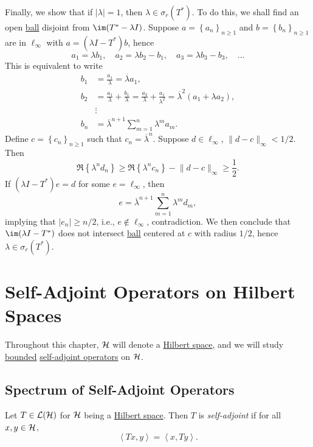 \begin{eg}
\begin{itemize}
		      Finally, we show that if \(\vert \lambda  \vert = 1\), then \(\lambda \in \sigma _r(T^{\ast} )\). To do this, we shall find an open \hyperref[def:ball]{ball} disjoint from \(\im(T^{\ast} - \lambda I)\). Suppose \(a = \left\{ a_n \right\} _{n\geq 1}\) and \(b = \left\{ b_n \right\} _{n\geq 1}\) are in \(\ell _\infty \) with \(a = (\lambda I-T^{\ast} )b\), hence
		      \[
			      a_1 = \lambda b_1,\quad
			      a_2 = \lambda b_2 - b_1,\quad
			      a_3 = \lambda b_3 - b_3, \quad \ldots
		      \]
		      This is equivalent to write
		      \[
			      \begin{split}
				      b_1 &= \frac{a_1}{\lambda } = \overline{\lambda} a_1, \\
				      b_2 &= \frac{a_1}{\lambda } + \frac{b_1}{\lambda } = \frac{a_2}{\lambda } + \frac{a_1}{\lambda ^{2} } = \overline{\lambda} ^{2} (a_1 + \lambda a_2), \\
				      &\vdots\\
				      b_n &= \overline{\lambda} ^{n+1}\sum_{m=1}^{n} \lambda ^m a_m.
			      \end{split}
		      \]
		      Define \(c = \left\{ c_n \right\} _{n\geq 1}\) such that \(c_n = \overline{\lambda} ^n\). Suppose \(d\in \ell _\infty \), \(\lVert d-c \rVert _\infty < 1/2\). Then
		      \[
			      \Re \left\{ \lambda ^n d_n \right\}
			      \geq \Re \left\{ \lambda ^n c_n \right\} - \lVert d-c \rVert _\infty
			      \geq \frac{1}{2}.
		      \]
		      If \((\lambda I - T^{\ast} ) e = d\) for some \(e = \ell _\infty \), then
		      \[
			      e = \overline{\lambda} ^{n+1} \sum_{m=1}^{n} \lambda ^m d_m,
		      \]
		      implying that \(\vert e_n \vert \geq n / 2\), i.e., \(e \notin \ell _\infty \), contradiction. We then conclude that \(\im(\lambda I - T^{\ast} )\) does not intersect \hyperref[def:ball]{ball} centered at \(c\) with radius \(1 / 2\), hence \(\lambda \in \sigma _r(T^{\ast} )\).
	\end{itemize}
\end{eg}

\chapter{Self-Adjoint Operators on Hilbert Spaces}
Throughout this chapter, \(\mathcal{\MakeUppercase{h}} \) will denote a \hyperref[def:Hilbert-space]{Hilbert space}, and we will study \hyperref[rmk:bounded-op]{bounded} \hyperref[def:self-adjoint-op]{self-adjoint operators} on \(\mathcal{\MakeUppercase{h}} \).

\section{Spectrum of Self-Adjoint Operators}
\begin{definition}\label{def:self-adjoint-op}
	Let \(T\in \mathcal{\MakeUppercase{l}} (\mathcal{\MakeUppercase{h}} )\) for \(\mathcal{\MakeUppercase{h}} \) being a \hyperref[def:Hilbert-space]{Hilbert space}. Then \(T\) is \emph{self-adjoint} if for all \(x, y\in \mathcal{\MakeUppercase{h}} \),
	\[
		\left\langle Tx, y \right\rangle = \left\langle x, Ty \right\rangle.
	\]
\end{definition}

